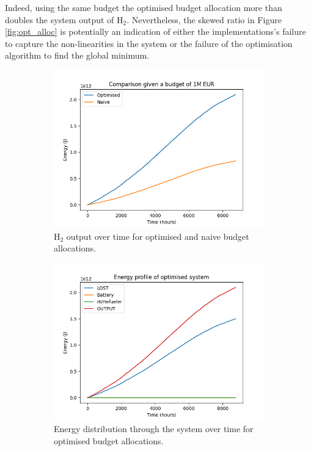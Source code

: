 \documentclass[]{article}
\numberwithin{equation}{section}
\theoremstyle{plain} %
\theoremstyle{definition}
\theoremstyle{remark}
\begin{document}
Indeed, using the same budget the optimised budget allocation more than doubles the system output of $\mathrm{H_2}$.
Nevertheless, the skewed ratio in Figure \ref{fig:opt_alloc} is potentially an
indication of either the implementations's failure to capture the non-linearities in the system
or the failure of the optimisation algorithm to find the global minimum.
\bigbreak


\begin{figure}[htbp]
    \centering
    \begin{subfigure}[h]{\textwidth}
        \centering
        \includegraphics[width=.75\textwidth]{assets/opt_naive_cmp.png}
        \caption{$\mathrm{H_2}$ output over time for optimised and naive budget allocations.}
        \label{fig:opt_naive_cmp}
    \end{subfigure}
    \hfill
    \begin{subfigure}[h]{\textwidth}
        \centering
        \includegraphics[width=.75\textwidth]{assets/opt_budget_profile.png}
        \caption{Energy distribution through the system over time for optimised budget allocations.}
        \label{fig:opt_budget_profile}
    \end{subfigure}
    \caption{}
    \label{fig:opt_perf}
\end{figure}
\end{document}
